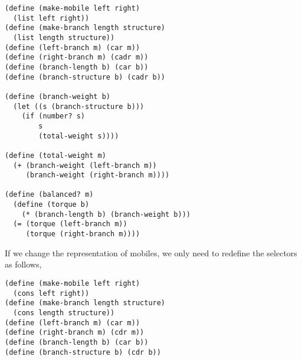\documentclass[a4paper,12pt]{article}
\begin{document}
\begin{lstlisting}
(define (make-mobile left right)
  (list left right))
(define (make-branch length structure)
  (list length structure))
(define (left-branch m) (car m))
(define (right-branch m) (cadr m))
(define (branch-length b) (car b))
(define (branch-structure b) (cadr b))

(define (branch-weight b)
  (let ((s (branch-structure b)))
    (if (number? s)
        s
        (total-weight s))))

(define (total-weight m)
  (+ (branch-weight (left-branch m))
     (branch-weight (right-branch m))))

(define (balanced? m)
  (define (torque b)
    (* (branch-length b) (branch-weight b)))
  (= (torque (left-branch m))
     (torque (right-branch m))))
\end{lstlisting}
If we change the representation of mobiles, we only need to redefine
the selectors as follows,
\begin{lstlisting}
(define (make-mobile left right)
  (cons left right))
(define (make-branch length structure)
  (cons length structure))
(define (left-branch m) (car m))
(define (right-branch m) (cdr m))
(define (branch-length b) (car b))
(define (branch-structure b) (cdr b))
\end{lstlisting}
\end{document}
